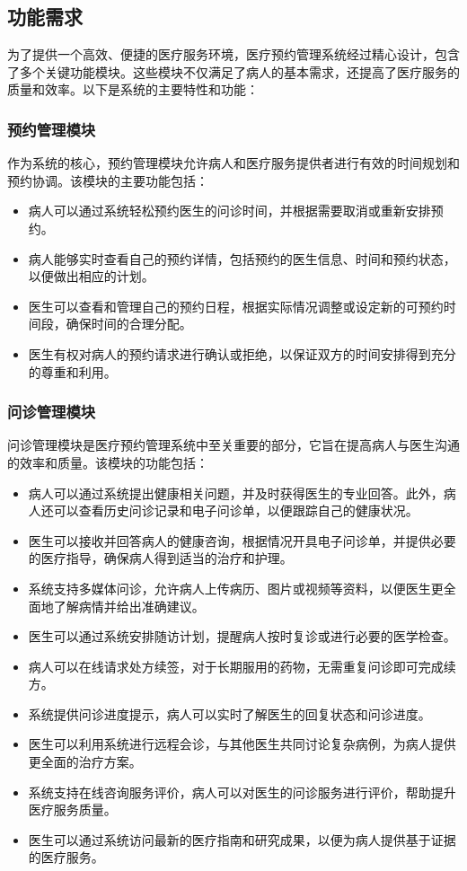 \subsection{功能需求}
为了提供一个高效、便捷的医疗服务环境，医疗预约管理系统经过精心设计，包含了多个关键功能模块。这些模块不仅满足了病人的基本需求，还提高了医疗服务的质量和效率。以下是系统的主要特性和功能：

\subsubsection{预约管理模块}
作为系统的核心，预约管理模块允许病人和医疗服务提供者进行有效的时间规划和预约协调。该模块的主要功能包括：
\begin{itemize}
	\item 病人可以通过系统轻松预约医生的问诊时间，并根据需要取消或重新安排预约。
	\item 病人能够实时查看自己的预约详情，包括预约的医生信息、时间和预约状态，以便做出相应的计划。
	\item 医生可以查看和管理自己的预约日程，根据实际情况调整或设定新的可预约时间段，确保时间的合理分配。
	\item 医生有权对病人的预约请求进行确认或拒绝，以保证双方的时间安排得到充分的尊重和利用。
\end{itemize}

\subsubsection{问诊管理模块}
问诊管理模块是医疗预约管理系统中至关重要的部分，它旨在提高病人与医生沟通的效率和质量。该模块的功能包括：

\begin{itemize}
	\item 病人可以通过系统提出健康相关问题，并及时获得医生的专业回答。此外，病人还可以查看历史问诊记录和电子问诊单，以便跟踪自己的健康状况。
	\item 医生可以接收并回答病人的健康咨询，根据情况开具电子问诊单，并提供必要的医疗指导，确保病人得到适当的治疗和护理。
	\item 系统支持多媒体问诊，允许病人上传病历、图片或视频等资料，以便医生更全面地了解病情并给出准确建议。
	\item 医生可以通过系统安排随访计划，提醒病人按时复诊或进行必要的医学检查。
	\item 病人可以在线请求处方续签，对于长期服用的药物，无需重复问诊即可完成续方。
	\item 系统提供问诊进度提示，病人可以实时了解医生的回复状态和问诊进度。
	\item 医生可以利用系统进行远程会诊，与其他医生共同讨论复杂病例，为病人提供更全面的治疗方案。
	\item 系统支持在线咨询服务评价，病人可以对医生的问诊服务进行评价，帮助提升医疗服务质量。
	\item 医生可以通过系统访问最新的医疗指南和研究成果，以便为病人提供基于证据的医疗服务。
\end{itemize}

